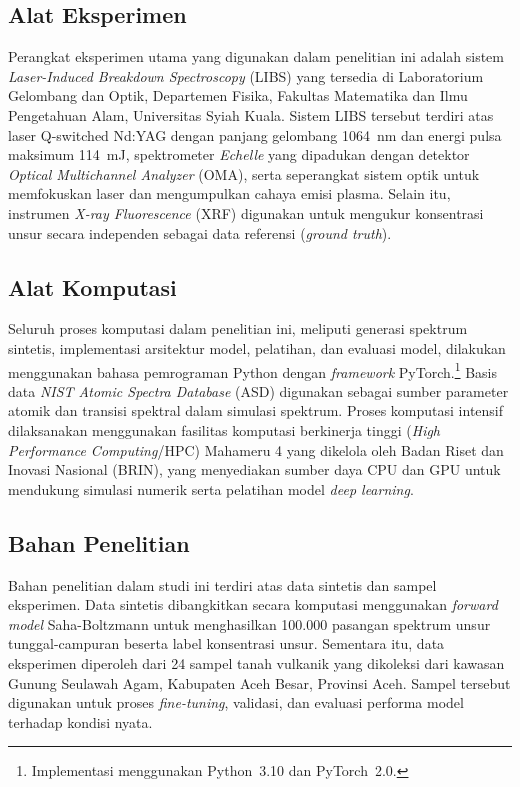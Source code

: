 \subsection{Alat Eksperimen}

Perangkat eksperimen utama yang digunakan dalam penelitian ini adalah sistem \textit{Laser-Induced Breakdown Spectroscopy} (LIBS) yang tersedia di Laboratorium Gelombang dan Optik, Departemen Fisika, Fakultas Matematika dan Ilmu Pengetahuan Alam, Universitas Syiah Kuala. Sistem LIBS tersebut terdiri atas laser Q-switched Nd:YAG dengan panjang gelombang 1064~nm dan energi pulsa maksimum 114~mJ, spektrometer \textit{Echelle} yang dipadukan dengan detektor \textit{Optical Multichannel Analyzer} (OMA), serta seperangkat sistem optik untuk memfokuskan laser dan mengumpulkan cahaya emisi plasma. Selain itu, instrumen \textit{X-ray Fluorescence} (XRF) digunakan untuk mengukur konsentrasi unsur secara independen sebagai data referensi (\textit{ground truth}).

\subsection{Alat Komputasi}

Seluruh proses komputasi dalam penelitian ini, meliputi generasi spektrum sintetis, implementasi arsitektur model, pelatihan, dan evaluasi model, dilakukan menggunakan bahasa pemrograman Python dengan \textit{framework} PyTorch.\footnote{Implementasi menggunakan Python~3.10 dan PyTorch~2.0.} Basis data \textit{NIST Atomic Spectra Database} (ASD) \citep{kramida_nist_2024} digunakan sebagai sumber parameter atomik dan transisi spektral dalam simulasi spektrum. Proses komputasi intensif dilaksanakan menggunakan fasilitas komputasi berkinerja tinggi (\textit{High Performance Computing}/HPC) Mahameru 4 yang dikelola oleh Badan Riset dan Inovasi Nasional (BRIN), yang menyediakan sumber daya CPU dan GPU untuk mendukung simulasi numerik serta pelatihan model \textit{deep learning}.

\subsection{Bahan Penelitian}

Bahan penelitian dalam studi ini terdiri atas data sintetis dan sampel eksperimen. Data sintetis dibangkitkan secara komputasi menggunakan \textit{forward model} Saha-Boltzmann untuk menghasilkan 100.000 pasangan spektrum unsur tunggal-campuran beserta label konsentrasi unsur. Sementara itu, data eksperimen diperoleh dari 24 sampel tanah vulkanik yang dikoleksi dari kawasan Gunung Seulawah Agam, Kabupaten Aceh Besar, Provinsi Aceh. Sampel tersebut digunakan untuk proses \textit{fine-tuning}, validasi, dan evaluasi performa model terhadap kondisi nyata.




